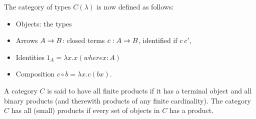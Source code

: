 The category of types $ C(\lambda ) $ is now defined as follows:
\begin{itemize}
\item Objects: the types
\item Arrows $A \rightarrow B$: closed terms $c: A \rightarrow B$, identified if $c ~ c'$,
\item Identities $1_A = \lambda x.x (where x : A) $
\item Composition $c \circ b = \lambda x.c(bx)$.
\end{itemize}

\begin{definition}
  A category $C$ is said to have all finite products if it has a terminal object
  and all binary products (and therewith products of any finite cardinality). The
  category $C$ has all (small) products if every set of objects in $C$ has a product.
\end{definition}